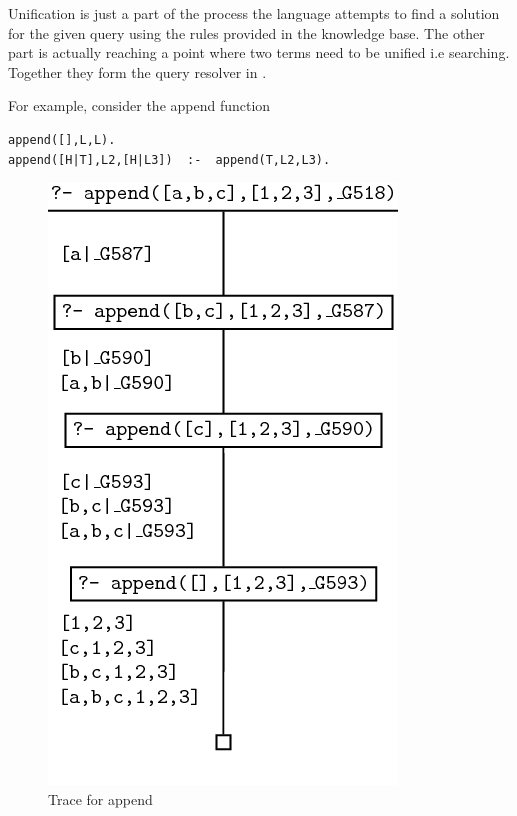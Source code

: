 \documentclass[thesis-solanki.tex]{subfiles}
\begin{document}
Unification is just a part of the process  the language
attempts to find a solution for the given query using the rules provided
in the knowledge base.
The other part is actually reaching a point where two terms need to be
unified i.e searching.
Together they form the query resolver in .

For example, consider the append function

\begin{verbatim}
append([],L,L).
append([H|T],L2,[H|L3])  :-  append(T,L2,L3).
\end{verbatim}


\begin{figure}
\centering
\includegraphics[scale = 0.5]{PrologAppendWorking.png}
\caption{Trace for append \cite{webiste:learnprolognowappend}}
\label{fig:Trace for append}
\end{figure}

\end{document}
